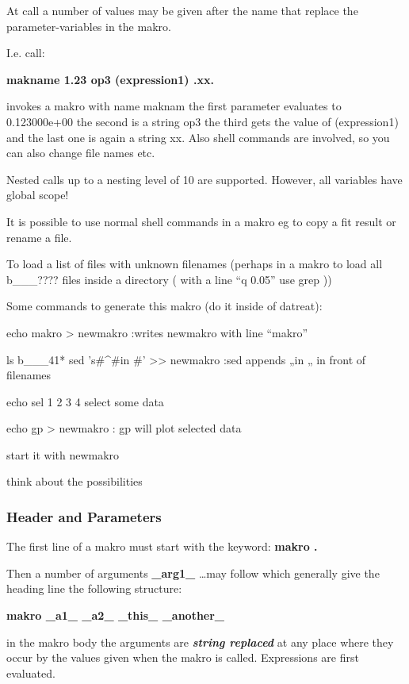 \documentclass[]{article}
\begin{document}
At call a number of values may be given after the name that replace the
parameter-variables in the makro.

I.e. call:

\textbf{makname 1.23 op3 (expression1) .xx.}

invokes a makro with name maknam the first parameter evaluates to
0.123000e+00 the second is a string op3 the third gets the value of
(expression1) and the last one is again a string xx. Also shell commands
are involved, so you can also change file names etc.

Nested calls up to a nesting level of 10 are supported. However, all
variables have global scope!

It is possible to use normal shell commands in a makro eg to copy a fit
result or rename a file.

To load a list of files with unknown filenames (perhaps in a makro to
load all b\_\_\_???? files inside a directory ( with a line ``q 0.05''
use grep ))

Some commands to generate this makro (do it inside of datreat):

echo makro \textgreater{} newmakro :writes newmakro with line ``makro''

ls b\_\_\_41* \textbar{} sed 's\#\^{}\#in \#'
\textgreater{}\textgreater{} newmakro :sed appends „in „ in front of
filenames

echo sel 1 2 3 4 select some data

echo gp \textgreater{} newmakro : gp will plot selected data

start it with newmakro

think about the possibilities

\hypertarget{header-and-parameters}{%
\subsubsection{Header and Parameters}\label{header-and-parameters}}

The first line of a makro must start with the keyword: \textbf{makro .}

Then a number of arguments \textbf{\_arg1\_} \ldots{}may follow which
generally give the heading line the following structure:

\textbf{makro \_a1\_ \_a2\_ \_this\_ \_another\_}

in the makro body the arguments are \emph{\textbf{string replaced}} at
any place where they occur by the values given when the makro is called.
Expressions are first evaluated.
\end{document}

